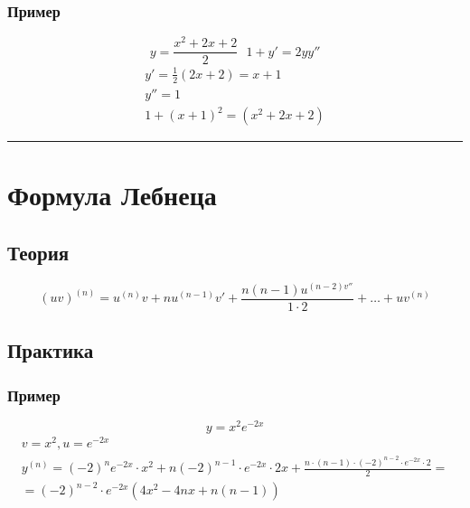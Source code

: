 \documentclass{article}
\begin{document}
\subsubsection{Пример}
\[
    y = \frac{x^2 + 2x + 2}{2} ~~~ 1 + y' = 2yy''
\]
\begin{gather*}
    y' = \frac{1}{2} (2x + 2) = x + 1 \\
    y'' = 1 \\
    1 + (x + 1)^2 = (x^2 + 2x + 2) 
\end{gather*}



\par\noindent\rule{\textwidth}{1pt}
\section{Формула Лебнеца}

\subsection{Теория}
\[
    (uv)^{(n)} = u^{(n)}v + nu^{(n - 1)}v' + \frac{n(n - 1)u^{(n - 2)v''}}{1 \cdot 2} + \dots + uv^{(n)}
\]


\subsection{Практика}

\subsubsection{Пример}
\[
    y = x^2 e^{-2x}
\]
\begin{gather*}
    v = x^2, u = e^{-2x} \\
    y^{(n)} = (-2)^n e^{-2x} \cdot x^2 + n(-2)^{n - 1} \cdot e^{-2x} \cdot 2x + \frac{n \cdot (n - 1) \cdot (-2)^{n - 2} \cdot e^{-2x} \cdot 2}{2} = \\
    = (-2)^{n - 2} \cdot e^{-2x} \left( 4x^2 - 4nx + n(n - 1) \right)
\end{gather*}
\end{document}
